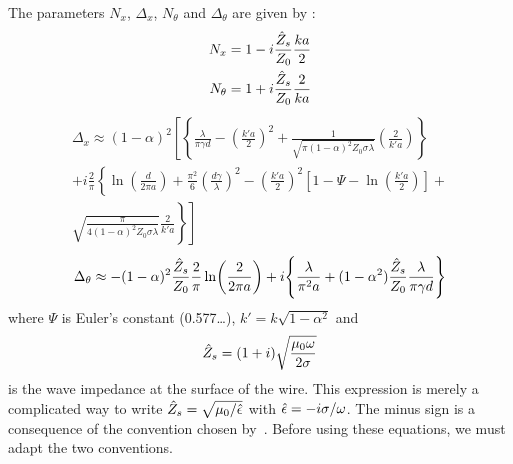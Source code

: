 The parameters $N_x$, $\Delta_x$, $N_\theta$ and $\Delta_\theta$ are given by \textcite{houde_2001}:
\begin{align}
    N_x
    &=
    1 - i \frac{\hat{Z}_s}{Z_0} \frac{ka}{2}
    \\
    N_\theta
    &=
    1 + i \frac{\hat{Z}_s}{Z_0} \frac{2}{ka}
\end{align}
\begin{multline}
    \Delta_x \approx
    (1-\alpha)^2
    \left[
        \left\lbrace
            \frac{\lambda}{\pi \gamma d}
            -
            \left(
                \frac{k'a}{2}
            \right)^2
            +
            \frac{
                1
            }{
                \sqrt{
                    \pi
                    (1 - \alpha)^2
                    Z_0
                    \sigma
                    \lambda
                }
            }
            \left(
                \frac{2}{k'a}
            \right)
        \right\rbrace
    \right.
    \\
        +i \frac{2}{\pi}
        \left\lbrace
            \ln \left( \frac{d}{2\pi a} \right)
            +
            \frac{\pi^2}{6}
            \left(
                \frac{d \gamma}{\lambda}
            \right)^2
            -
            \left(
                \frac{k'a}{2}
            \right)^2
            \left[
                1 - \Psi - \ln\left( \frac{k'a}{2} \right)
            \right]
        \right.
            +
    \\
    \left.
        \left.
            \sqrt{
                \frac{\pi}{
                    4
                    (1-\alpha)^2
                    Z_0
                    \sigma
                    \lambda
                }
            }
            \frac{2}{k'a}
        \right\rbrace
    \right]
\end{multline}
\begin{equation}
    \Delta_\theta
    \approx
    -(1-\alpha)^2
    \frac{\cp{Z}_s}{Z_0}
    \frac{2}{\pi}
    \ln \left(
        \frac{2}{2\pi a}
    \right)
    +
    i
    \left\lbrace
        \frac{\lambda}{\pi^2 a}
        +
        (1-\alpha^2)
        \frac{\cp{Z}_s}{Z_0}
        \frac{\lambda}{\pi \gamma d}
    \right\rbrace
\end{equation}
where $\Psi$ is Euler's constant (\num{0.577}\dots), $k'= k \sqrt{1-\alpha^2}$ and
\begin{equation}
    \hat{Z}_s = (1 + i) \sqrt{\frac{\mu_0 \omega}{2 \sigma}}
\end{equation}
is the wave impedance at the surface of the wire.
This expression is merely a complicated way to write
$\hat{Z}_s = \sqrt{\mu_0 / \hat{\epsilon}}$ with $\hat{\epsilon}=-i \sigma / \omega$.
The minus sign is a consequence of the convention chosen by~\citeauthor{houde_2001}.
Before using these equations, we must adapt the two conventions.


